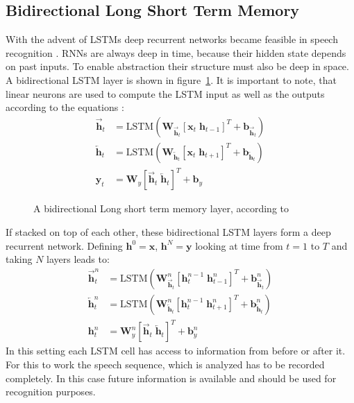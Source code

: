 \subsection{Bidirectional Long Short Term Memory}
With the advent of LSTMs deep recurrent networks became feasible in speech recognition \cite{Graves2013b}. RNNs are always deep in time, because their hidden state depends on past inputs. To enable abstraction their structure must also be deep in space. A bidirectional LSTM layer is shown in figure~\ref{fig:blstm}. It is important to note, that linear neurons are used to compute the LSTM input as well as the outputs according to the equations \cite{Graves2013b}:
\begin{align}
\overrightarrow{\mathbf{h}}_t &= \text{LSTM}(\mathbf{W}_{\overrightarrow{\mathbf{h}}_t} [\mathbf{x}_t \; \mathbf{h}_{t-1}]^T + \mathbf{b}_{\overrightarrow{\mathbf{h}}_t}) 
\\
\overleftarrow{\mathbf{h}}_t &= \text{LSTM}(\mathbf{W}_{\overleftarrow{\mathbf{h}}_t} [\mathbf{x}_t \; \mathbf{h}_{t+1}]^T + \mathbf{b}_{\overleftarrow{\mathbf{h}}_t})
\\
\mathbf{y}_t &= \mathbf{W}_{y} [\overrightarrow{\mathbf{h}}_t \; \overleftarrow{\mathbf{h}}_t]^T + \mathbf{b}_y  
\end{align}
\begin{figure}
\centering

\caption{A bidirectional Long short term memory layer, according to \cite{Graves2013b} }
\label{fig:blstm}
\end{figure}
If stacked on top of each other, these bidirectional LSTM layers form a deep recurrent network. Defining $\mathbf{h}^0 = \mathbf{x}$, $\mathbf{h}^N = \mathbf{y}$ looking at time from $t = 1$ to $T$ and taking $N$ layers leads to:
\begin{align}
\overrightarrow{\mathbf{h}}_t^n &= \text{LSTM}(\mathbf{W}_{\overrightarrow{\mathbf{h}}_t}^n [\mathbf{h}_t^{n-1} \; \mathbf{h}_{t-1}^n]^T + \mathbf{b}_{\overrightarrow{\mathbf{h}}_t}^n) 
\\
\overleftarrow{\mathbf{h}}_t^n &= \text{LSTM}(\mathbf{W}_{\overleftarrow{\mathbf{h}}_t}^n [\mathbf{h}_t^{n-1} \; \mathbf{h}_{t+1}^n]^T + \mathbf{b}_{\overleftarrow{\mathbf{h}}_t}^n)
\\
\mathbf{h}_t^n &= \mathbf{W}_{y}^n [\overrightarrow{\mathbf{h}}_t \; \overleftarrow{\mathbf{h}}_t]^T + \mathbf{b}_y^n
\end{align}
In this setting each LSTM cell has access to information from before or after it. For this to work the speech sequence, which is analyzed has to be recorded completely. In this case future information is available and should be used for recognition purposes.

